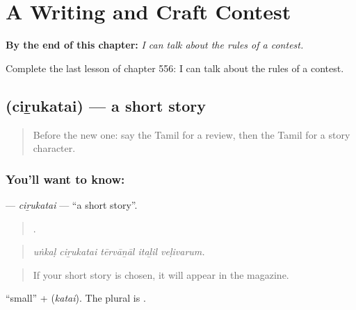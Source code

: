 
\chapter{A Writing and Craft Contest}
\label{ch:ta-a-writing-and-craft-contest}

\begin{chapteropening}
\textbf{By the end of this chapter:} \emph{I can talk about the rules of a contest.}

Complete the last lesson of chapter 556: I can talk about the rules of a contest.
\end{chapteropening}

\section[\texorpdfstring{\ta{சிறுகதை} (ciṟukatai)}{சிறுகதை (ciṟukatai)}]{ (ciṟukatai) — a short story}

\label{lesson:TA-C556-cirukatai}



\begin{quote}
Before the new one: say the Tamil for a review, then the Tamil for a story character.
\end{quote}

\subsection*{You'll want to know: }
\textbf{} — \emph{ciṟukatai} — \textquotedblleft{}a short story\textquotedblright{}.

\begin{quote}
    .
\end{quote}

\begin{quote}
\emph{uṅkaḷ ciṟukatai tērvāṉāl itaḻil veḷivarum.}
\end{quote}

\begin{quote}
If your short story is chosen, it will appear in the magazine.
\end{quote}

 \textquotedblleft{}small\textquotedblright{} +  (\emph{katai}). The plural is .


